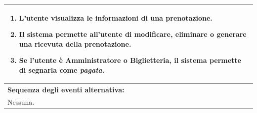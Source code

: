 \documentclass{article}
\begin{document}
\begin{table}[H]
\begin{tabular}{|p{\linewidth}|}
\begin{minipage}{\linewidth}
\begin{enumerate}
                                \item L'utente visualizza le informazioni di una prenotazione.
                                \item Il sistema permette all'utente di modificare, eliminare o generare una ricevuta della prenotazione. %
                                \item Se l'utente è Amministratore o Biglietteria, il sistema permette di segnarla come \emph{pagata}.
                            \end{enumerate}
                        \end{minipage}
                        \vspace{0pt} \\
                        \hline
                        \textbf{Sequenza degli eventi alternativa:} \\
                        Nessuna. \\
                        \hline
                    \end{tabular}
                \end{table}
\end{document}
